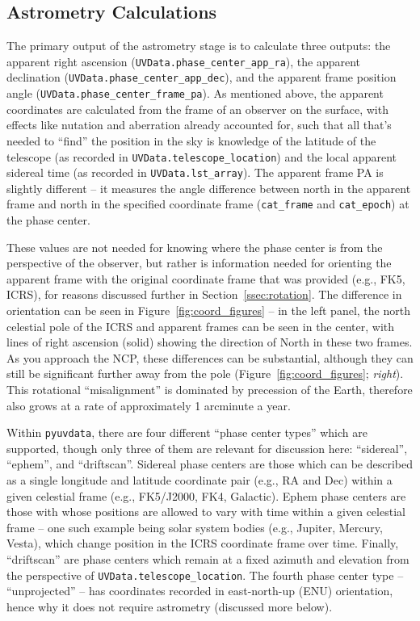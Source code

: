 \documentclass[11pt, oneside]{article}
\begin{document}
\subsection{Astrometry Calculations}\label{ssec:astrometry}
The primary output of the astrometry stage is to calculate three outputs: the apparent right ascension (\texttt{UVData.phase\_center\_app\_ra}), the apparent declination (\texttt{UVData.phase\_center\_app\_dec}), and the apparent frame position angle (\texttt{UVData.phase\_center\_frame\_pa}). As mentioned above, the apparent coordinates are calculated from the frame of an observer on the surface, with effects like nutation and aberration already accounted for, such that all that's needed to ``find'' the position in the sky is knowledge of the latitude of the telescope (as recorded in \texttt{UVData.telescope\_location}) and the local apparent sidereal time (as recorded in \texttt{UVData.lst\_array}). The apparent frame PA is slightly different -- it measures the angle difference between north in the apparent frame and north in the specified coordinate frame (\texttt{cat\_frame} and \texttt{cat\_epoch}) at the phase center. 

These values are not needed for knowing where the phase center is from the perspective of the observer, but rather is information needed for orienting the apparent frame with the original coordinate frame that was provided (e.g., FK5, ICRS),  for reasons discussed further in Section~\ref{ssec:rotation}. The difference in orientation can be seen in Figure~\ref{fig:coord_figures} -- in the left panel, the north celestial pole of the ICRS and apparent frames can be seen in the center, with lines of right ascension (solid) showing the direction of North in these two frames. As you approach the NCP, these differences can be substantial, although they can still be significant further away from the pole (Figure~\ref{fig:coord_figures}; \emph{right}). This rotational ``misalignment'' is dominated by precession of the Earth, therefore also grows at a rate of approximately 1 arcminute a year.

Within \texttt{pyuvdata}, there are four different ``phase center types'' which are supported, though only three of them are relevant for discussion here: ``sidereal'', ``ephem'', and ``driftscan''.  Sidereal phase centers are those which can be described as a single longitude and latitude coordinate pair (e.g., RA and Dec) within a given celestial frame (e.g., FK5/J2000, FK4, Galactic). Ephem phase centers are those with whose positions are allowed to vary with time within a given celestial frame -- one such example being solar system bodies (e.g., Jupiter, Mercury, Vesta), which change position in the ICRS coordinate frame over time. Finally, ``driftscan'' are phase centers which remain at a fixed azimuth and elevation from the perspective of \texttt{UVData.telescope\_location}. The fourth phase center type -- ``unprojected'' -- has coordinates recorded in east-north-up (ENU) orientation, hence why it does not require astrometry (discussed more below).
\end{document}

